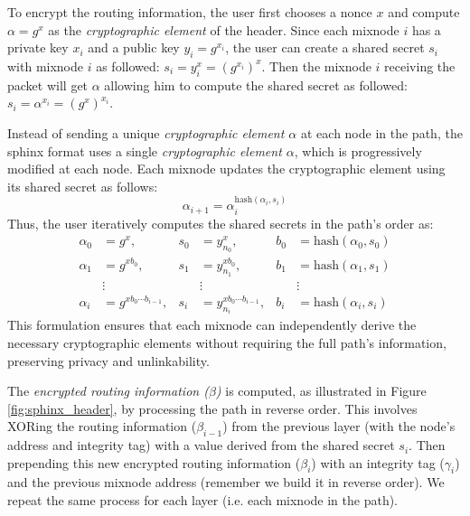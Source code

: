 To encrypt the routing information, the user first chooses a nonce $x$ and compute $\alpha = g^x$ as the \textit{cryptographic element} of the header.
Since each mixnode $i$ has a private key $x_i$ and a public key $y_i = g^{x_i}$, the user can create a shared secret $s_i$ with mixnode $i$ as followed: $s_i = y_i^x = (g^{x_i})^x$. 
Then the mixnode $i$ receiving the packet will get $\alpha$ allowing him to compute the shared secret as followed: $s_i = \alpha^{x_i} = (g^x)^{x_i}$.

Instead of sending a unique \textit{cryptographic element $\alpha$} at each node in the path, the sphinx format uses a single \textit{cryptographic element $\alpha$}, which is progressively modified at each node. 
Each mixnode updates the cryptographic element using its shared secret as follows:  
$$\alpha_{i+1} = \alpha_i^{\text{hash}(\alpha_i, s_i)}$$
Thus, the user iteratively computes the shared secrets in the path's order as: 
$$
\begin{aligned}
    \alpha_0 &= g^{x}, & s_0 &= y_{n_0}^{x}, & b_0 &= \text{hash}(\alpha_0, s_0) \\
    \alpha_1 &= g^{x b_0}, & s_1 &= y_{n_1}^{x b_0}, & b_1 &= \text{hash}(\alpha_1, s_1) \\
    &\vdots & &\vdots & &\vdots \\
    \alpha_i &= g^{x b_0 \cdots b_{i-1}}, & s_i &= y_{n_i}^{x b_0 \cdots b_{i-1}}, & b_i &= \text{hash}(\alpha_i, s_i)
\end{aligned}
$$
This formulation ensures that each mixnode can independently derive the necessary cryptographic elements without requiring the full path’s information, preserving privacy and unlinkability.  
\newline

The \textit{encrypted routing information ($\beta$)} is computed, as illustrated in Figure \ref{fig:sphinx_header}, by processing the path in reverse order. 
This involves XORing the routing information ($\beta_{i-1}$) from the previous layer (with the node's address and integrity tag) with a value derived from the shared secret $s_i$. 
Then prepending this new encrypted routing information ($\beta_i$) with an integrity tag ($\gamma_i$) and the previous mixnode address (remember we build it in reverse order).
We repeat the same process for each layer (i.e. each mixnode in the path).

